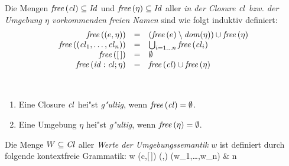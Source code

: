 \documentclass[12pt,fleqn,a4paper]{article}
\newcommand{\Cl}{\name{Cl}}
\newcommand{\cl}{\name{cl}}
\begin{document}
\begin{definition}
  Die Mengen $\free{\cl}\subseteq\Id$ und ${\text{\it free\/}}\,(\eta)\subseteq{\text{\it Id\/}}$ aller
  \emph{in der Closure $\cl$ bzw. der Umgebung $\eta$ vorkommenden freien Namen} sind wie folgt
  induktiv definiert:
  \[\begin{array}{rcl}
    \free{(e,\eta)} &=& (\free{e} \setminus \dom{\eta}) \cup \free{\eta} \\
    \free{(\cl_1,\ldots,\cl_n)} &=& \bigcup_{i=1 \ldots n} \free{\cl_i} \\
    \free{[\,]} &=& \emptyset \\
    \free{\id:\cl;\eta} &=& \free{\cl} \cup \free{\eta} \\
  \end{array}\]
\end{definition}

\begin{definition} \
  \begin{enumerate}
  \item Eine Closure $\cl$ hei"st \emph{g"ultig}, wenn $\free{\cl} = \emptyset$.
  \item Eine Umgebung $\eta$ hei"st \emph{g"ultig}, wenn ${\text{\it free\/}}\,(\eta) = \emptyset$.
  \end{enumerate}
\end{definition}

\begin{definition}
  Die Menge $W \subseteq \Cl$ aller \emph{Werte der Umgebungssemantik} $w$ ist definiert durch
  folgende kontextfreie Grammatik:
  \bgram
  w \is (c,[\,])
  \al (,\eta)
  \al (w_1,\ldots,w_n) &  n 
  \egram
\end{definition}
\end{document}
